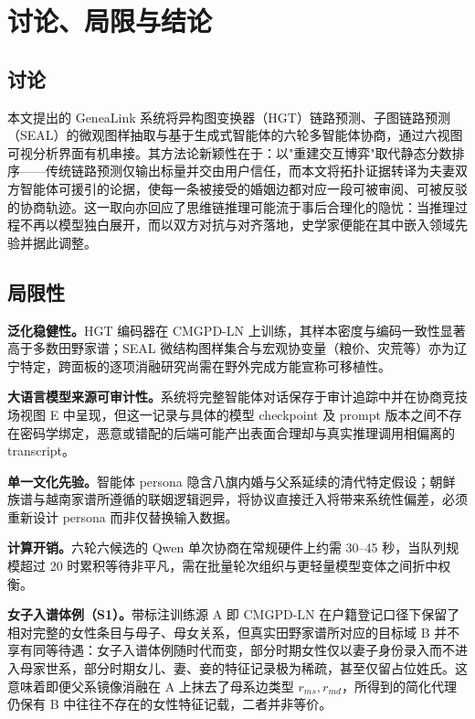 \chapter{讨论、局限与结论}\label{chap:conclusion}

\section{讨论}\label{sec:conclusion-discussion}

本文提出的 GeneaLink 系统将异构图变换器（HGT）链路预测\citep{hu2020hgt}、子图链路预测（SEAL）的微观图样抽取\citep{zhang2018seal}与基于生成式智能体\citep{park2023generative}的六轮多智能体协商，通过六视图可视分析界面有机串接。其方法论新颖性在于：以"重建交互博弈"取代静态分数排序——传统链路预测仅输出标量并交由用户信任，而本文将拓扑证据转译为夫妻双方智能体可援引的论据，使每一条被接受的婚姻边都对应一段可被审阅、可被反驳的协商轨迹。这一取向亦回应了思维链推理可能流于事后合理化\citep{turpin2023faithfulness}的隐忧：当推理过程不再以模型独白展开，而以双方对抗与对齐落地，史学家便能在其中嵌入领域先验并据此调整。

\section{局限性}\label{sec:conclusion-limit}

\textbf{泛化稳健性。}HGT 编码器在 CMGPD-LN 上训练，其样本密度与编码一致性显著高于多数田野家谱；SEAL 微结构图样集合与宏观协变量（粮价、灾荒等）亦为辽宁特定，跨面板的逐项消融研究尚需在野外完成方能宣称可移植性。

\textbf{大语言模型来源可审计性。}系统将完整智能体对话保存于审计追踪中并在协商竞技场视图 E 中呈现，但这一记录与具体的模型 checkpoint 及 prompt 版本之间不存在密码学绑定，恶意或错配的后端可能产出表面合理却与真实推理调用相偏离的 transcript。

\textbf{单一文化先验。}智能体 persona 隐含八旗内婚与父系延续的清代特定假设；朝鲜族谱与越南家谱所遵循的联姻逻辑迥异，将协议直接迁入将带来系统性偏差，必须重新设计 persona 而非仅替换输入数据。

\textbf{计算开销。}六轮六候选的 Qwen 单次协商在常规硬件上约需 30--45 秒，当队列规模超过 20 时累积等待非平凡，需在批量轮次组织与更轻量模型变体之间折中权衡。

\textbf{女子入谱体例（S1）。}带标注训练源 A 即 CMGPD-LN 在户籍登记口径下保留了相对完整的女性条目与母子、母女关系，但真实田野家谱所对应的目标域 B 并不享有同等待遇：女子入谱体例随时代而变，部分时期女性仅以妻子身份录入而不进入母家世系，部分时期女儿、妻、妾的特征记录极为稀疏，甚至仅留占位姓氏\citep{yan2009nuzi}。这意味着即便父系镜像消融在 A 上抹去了母系边类型 \(r_{ms}, r_{md}\)，所得到的简化代理仍保有 B 中往往不存在的女性特征记载，二者并非等价。

